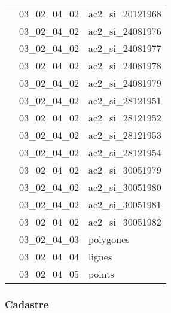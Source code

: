 \documentclass[12pt,titlepage]{book}
\begin{document}
\begin{supertabular}{|p{10cm}|c|p{15cm}|}
                    & 03\_02\_04\_02 & ac2\_si\_20121968\\


                    & 03\_02\_04\_02 & ac2\_si\_24081976\\


                    & 03\_02\_04\_02 & ac2\_si\_24081977\\


                    & 03\_02\_04\_02 & ac2\_si\_24081978\\


                    & 03\_02\_04\_02 & ac2\_si\_24081979\\


                    & 03\_02\_04\_02 & ac2\_si\_28121951\\


                    & 03\_02\_04\_02 & ac2\_si\_28121952\\


                    & 03\_02\_04\_02 & ac2\_si\_28121953\\


                    & 03\_02\_04\_02 & ac2\_si\_28121954\\


                    & 03\_02\_04\_02 & ac2\_si\_30051979\\


                    & 03\_02\_04\_02 & ac2\_si\_30051980\\


                    & 03\_02\_04\_02 & ac2\_si\_30051981\\


                    & 03\_02\_04\_02 & ac2\_si\_30051982\\


                    & 03\_02\_04\_03 & polygones\\


                    & 03\_02\_04\_04 & lignes\\


                    & 03\_02\_04\_05 & points\\
\hline
\end{supertabular}

\subsubsection{\large Cadastre}
\end{document}
